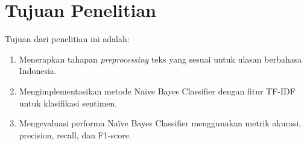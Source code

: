 \section{Tujuan Penelitian}

Tujuan dari penelitian ini adalah:

\begin{enumerate}
  \item Menerapkan tahapan \emph{preprocessing} teks yang sesuai untuk ulasan berbahasa Indonesia.
  \item Mengimplementasikan metode Na\"ive Bayes Classifier dengan fitur TF-IDF untuk klasifikasi sentimen.
  \item Mengevaluasi performa Na\"ive Bayes Classifier menggunakan metrik akurasi, precision, recall, dan F1-score.
\end{enumerate}

